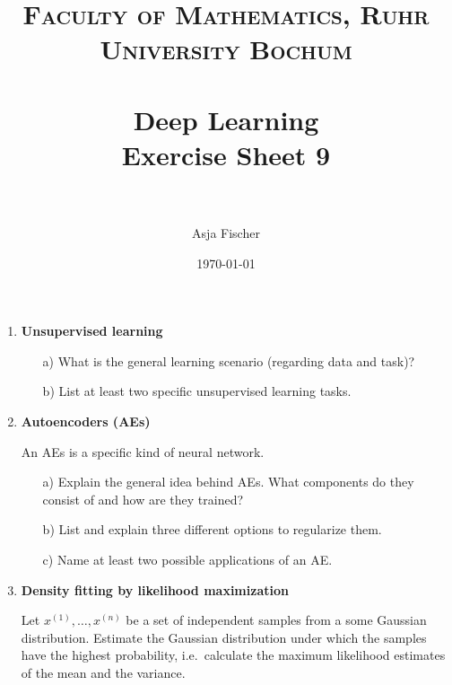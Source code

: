 \documentclass[paper=a4, fontsize=11pt,dvipsnames]{scrartcl} %
\title{	
\normalfont \normalsize 
\textsc{Faculty of Mathematics, Ruhr University Bochum} \\ [25pt] %
\horrule{0.5pt} \\[0.4cm] %
\huge Deep Learning\\{\Large Exercise Sheet 9}\\ %
\horrule{2pt} \\[0.5cm] %
}
\author{Asja Fischer} %
\date{\normalsize\today} %
\numberwithin{equation}{section} %
\numberwithin{figure}{section} %
\numberwithin{table}{section} %
\begin{document}
\maketitle %
\begin{enumerate} 

\item \textbf{Unsupervised learning}

\begin{itemize}
\item[a)] What is the general learning scenario (regarding data and task)?
\item[b)] List at least two specific unsupervised learning tasks. 
\end{itemize}

\item \textbf{Autoencoders (AEs)}

An AEs is a specific kind of neural network.
\begin{itemize}
\item[a)] Explain the general idea behind AEs.  What components do they  consist of and how are they trained?
\item[b)] List and explain three different options to regularize them.
\item[c)] Name at least two possible applications of an AE.
\end{itemize}


\item \textbf{Density fitting by likelihood maximization}

Let $x^{(1)}, \dots, x^{(n)}$ be a set of independent samples from a some Gaussian distribution. Estimate the Gaussian distribution under which the samples have the highest 
probability, i.e.~calculate the maximum likelihood estimates of the mean and the variance.
\end{enumerate}




\end{document}
